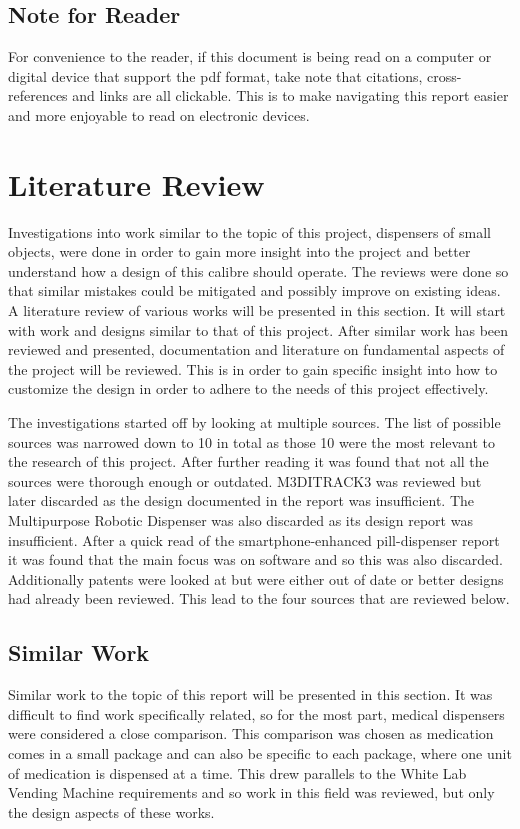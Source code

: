 \documentclass[a4paper,11pt]{article}
\numberwithin{figure}{section}
\numberwithin{table}{section}
\begin{document}
	\subsection{Note for Reader}
	For convenience to the reader, if this document is being read on a computer or digital device that support the pdf format, take note that citations, cross-references and links are all clickable. This is to make navigating this report easier and more enjoyable to read on electronic devices.
	\newpage
\setlength{\parskip}{1em}
\section{Literature Review}\thispagestyle{sectionstart}
Investigations into work similar to the topic of this project, dispensers of small objects, were done in order to gain more insight into the project and better understand how a design of this calibre should operate. The reviews were done so that similar mistakes could be mitigated and possibly improve on existing ideas. A literature review of various works will be presented in this section. It will start with work and designs similar to that of this project. After similar work has been reviewed and presented, documentation and literature on fundamental aspects of the project will be reviewed. This is in order to gain specific insight into how to customize the design in order to adhere to the needs of this project effectively. 

The investigations started off by looking at multiple sources. The list of possible sources was narrowed down to 10 in total as those 10 were the most relevant to the research of this project. After further reading it was found that not all the sources were thorough enough or outdated. M3DITRACK3 \cite{CHELVAM2014240} was reviewed but later discarded as the design documented in the report was insufficient. The Multipurpose Robotic Dispenser \cite{6203052} was also discarded as its design report was insufficient. After a quick read of the smartphone-enhanced pill-dispenser \cite{7145252} report it was found that the main focus was on software and so this was also discarded. Additionally patents were looked at but were either out of date or better designs had already been reviewed. This lead to the four sources that are reviewed below.
\subsection{Similar Work}
Similar work to the topic of this report will be presented in this section. It was difficult to find work specifically related, so for the most part, medical dispensers were considered a close comparison. This comparison was chosen as medication comes in a small package and can also be specific to each package, where one unit of medication is dispensed at a time. This drew parallels to the White Lab Vending Machine requirements and so work in this field was reviewed, but only the design aspects of these works.
\end{document}
